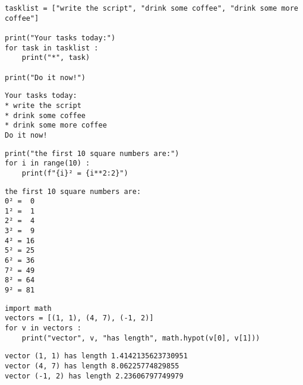 \begin{frame}[fragile]
%
\begin{codebox}
\begin{verbatim}
tasklist = ["write the script", "drink some coffee", "drink some more coffee"]

print("Your tasks today:")
for task in tasklist :
    print("*", task)

print("Do it now!")
\end{verbatim}
\end{codebox}
%
\begin{cmdbox}
\begin{verbatim}
Your tasks today:
* write the script
* drink some coffee
* drink some more coffee
Do it now!
\end{verbatim}
\end{cmdbox}
%
\end{frame}


\begin{frame}[fragile]
%
\begin{codebox}
\begin{verbatim}
print("the first 10 square numbers are:")
for i in range(10) :
    print(f"{i}² = {i**2:2}")
\end{verbatim}
\end{codebox}
%
\begin{cmdbox}
\begin{verbatim}
the first 10 square numbers are:
0² =  0
1² =  1
2² =  4
3² =  9
4² = 16
5² = 25
6² = 36
7² = 49
8² = 64
9² = 81
\end{verbatim}
\end{cmdbox}
%
\end{frame}


\begin{frame}[fragile]
%
\begin{codebox}
\begin{verbatim}
import math
vectors = [(1, 1), (4, 7), (-1, 2)]
for v in vectors :
    print("vector", v, "has length", math.hypot(v[0], v[1]))
\end{verbatim}
\end{codebox}
%
\begin{cmdbox}
\begin{verbatim}
vector (1, 1) has length 1.4142135623730951
vector (4, 7) has length 8.06225774829855
vector (-1, 2) has length 2.23606797749979
\end{verbatim}
\end{cmdbox}
%
\end{frame}

